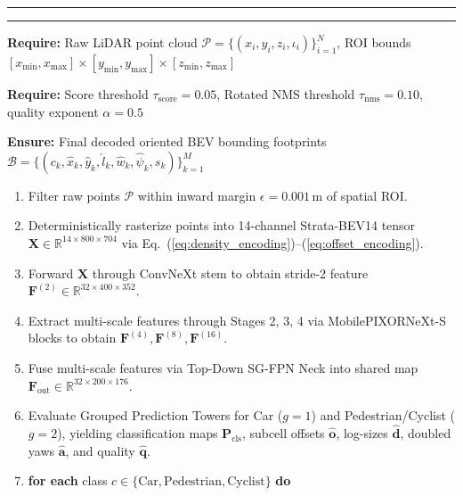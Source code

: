 \noindent
\rule{\linewidth}{0.6pt}\par\vspace{1pt}
\begingroup
\setlength{\tabcapgap}{0pt}
\label{alg:inference_pipeline}
\endgroup
\par\noindent\rule{\linewidth}{1pt}\par
{\small
\noindent\textbf{Require:} Raw LiDAR point cloud $\mathcal{P} = \{(x_i, y_i, z_i, \iota_i)\}_{i=1}^N$, ROI bounds $[x_{\min}, x_{\max}] \times [y_{\min}, y_{\max}] \times [z_{\min}, z_{\max}]$\par
\noindent\textbf{Require:} Score threshold $\tau_{\mathrm{score}} = 0.05$, Rotated NMS threshold $\tau_{\mathrm{nms}} = 0.10$, quality exponent $\alpha = 0.5$\par
\noindent\textbf{Ensure:} Final decoded oriented BEV bounding footprints $\mathcal{B} = \{(c_k, \hat{x}_k, \hat{y}_k, \hat{l}_k, \hat{w}_k, \hat{\psi}_k, s_k)\}_{k=1}^M$\par
\begin{enumerate}
    \setlength{\topsep}{2pt}
    \setlength{\itemsep}{0pt}
    \setlength{\parsep}{0pt}
    \renewcommand{\labelenumi}{\textbf{\arabic{enumi}:}}
    \item Filter raw points $\mathcal{P}$ within inward margin $\epsilon = 0.001$\,m of spatial ROI.
    \item Deterministically rasterize points into 14-channel Strata-BEV14 tensor $\mathbf{X} \in \mathbb{R}^{14 \times 800 \times 704}$ via Eq.~(\ref{eq:density_encoding})--(\ref{eq:offset_encoding}).
    \item Forward $\mathbf{X}$ through ConvNeXt stem to obtain stride-2 feature $\mathbf{F}^{(2)} \in \mathbb{R}^{32 \times 400 \times 352}$.
    \item Extract multi-scale features through Stages 2, 3, 4 via MobilePIXORNeXt-S blocks to obtain $\mathbf{F}^{(4)}, \mathbf{F}^{(8)}, \mathbf{F}^{(16)}$.
    \item Fuse multi-scale features via Top-Down SG-FPN Neck into shared map $\mathbf{F}_{\mathrm{out}} \in \mathbb{R}^{32 \times 200 \times 176}$.
    \item Evaluate Grouped Prediction Towers for Car ($g=1$) and Pedestrian/Cyclist ($g=2$), yielding classification maps $\mathbf{P}_{\mathrm{cls}}$, subcell offsets $\widehat{\mathbf{o}}$, log-sizes $\widehat{\mathbf{d}}$, doubled yaws $\widehat{\mathbf{a}}$, and quality $\widehat{\mathbf{q}}$.
    \item \textbf{for each} class $c \in \{\text{Car}, \text{Pedestrian}, \text{Cyclist}\}$ \textbf{do}

\end{enumerate}}
